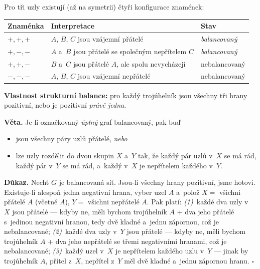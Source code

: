\documentclass[11pt,a4paper]{article}
\theoremstyle{definition}
\begin{document}
\begin{defbox}
Pro tři uzly existují (až na symetrii) čtyři konfigurace znamének:
\begin{center}
\small
\begin{tabular}{@{}p{3.0cm}p{9.5cm}p{2.4cm}@{}}
\toprule
\textbf{Znaménka} & \textbf{Interpretace} & \textbf{Stav} \\
\midrule
$+,+,+$ & $A$, $B$, $C$ jsou vzájemní přátelé & \emph{balancovaný} \\
$+,-,-$ & $A$ a~$B$ jsou přátelé se společným nepřítelem $C$ & \emph{balancovaný} \\
$+,+,-$ & $B$ a~$C$ jsou přátelé $A$, ale spolu nevycházejí & nebalancovaný \\
$-,-,-$ & $A$, $B$, $C$ jsou vzájemní nepřátelé & nebalancovaný \\
\bottomrule
\end{tabular}
\end{center}
\textbf{Vlastnost strukturní balance:} pro každý trojúhelník jsou všechny tři hrany pozitivní,
nebo je pozitivní \emph{právě jedna}.
\end{defbox}

\begin{defbox}
\textbf{Věta.} Je-li označkovaný \emph{úplný} graf balancovaný, pak buď
\begin{itemize}
\item jsou všechny páry uzlů přátelé, \emph{nebo}
\item lze uzly rozdělit do dvou skupin $X$ a~$Y$ tak, že každý pár uzlů v~$X$ se má rád,
      každý pár v~$Y$ se má rád, a~každý v~$X$ je nepřítelem každého v~$Y$.
\end{itemize}

\textbf{Důkaz.} Nechť $G$ je balancovaná síť. Jsou-li všechny hrany pozitivní, jsme hotovi.
Existuje-li alespoň jedna negativní hrana, vyber uzel $A$ a~polož
$X=$ všichni přátelé $A$ (včetně $A$), $Y=$ všichni nepřátelé $A$. Pak platí:
\emph{(1)}~každé dva uzly v~$X$ jsou přátelé --- kdyby ne, měli bychom trojúhelník
$A$ + dva jeho přátelé s~jedinou negativní hranou, tedy dvě kladné a~jednu zápornou, což je
nebalancované; \emph{(2)}~každé dva uzly v~$Y$ jsou přátelé --- kdyby ne, měli bychom
trojúhelník $A$ + dva jeho nepřátelé se třemi negativními hranami, což je nebalancované;
\emph{(3)}~každý uzel v~$X$ je nepřítelem každého uzlu v~$Y$ --- jinak by trojúhelník
$A$, přítel z~$X$, nepřítel z~$Y$ měl dvě kladné a~jednu zápornou hranu. $\square$
\end{defbox}
\end{document}
